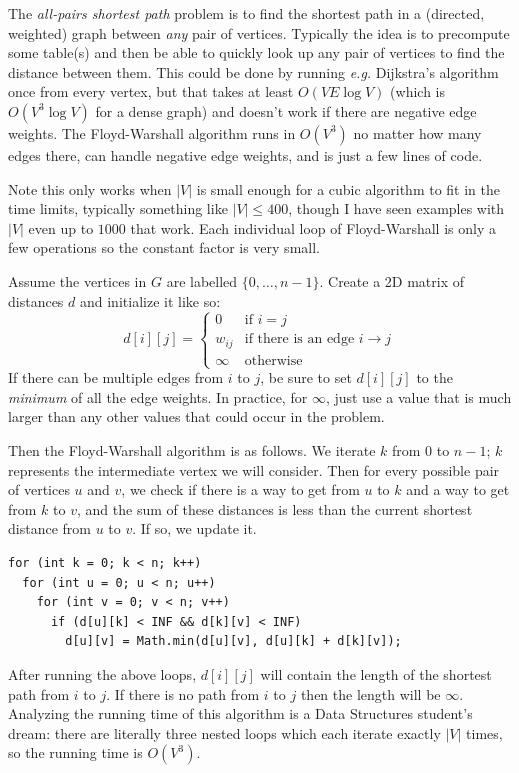 \documentclass[10pt]{book}
\begin{document}
The \emph{all-pairs shortest path} problem is to find the shortest
path in a (directed, weighted) graph between \emph{any} pair of
vertices.  Typically the idea is to precompute some table(s)
and then be able to quickly look up any pair of vertices to find the
distance between them.  This could be done by running \emph{e.g.}
Dijkstra's algorithm once from every vertex, but that takes at least
$O(VE \log V)$ (which is $O(V^3 \log V)$ for a dense graph) and
doesn't work if there are negative edge weights. The Floyd-Warshall
algorithm runs in $O(V^3)$ no matter how many edges there, can
handle negative edge weights, and is just a few lines of code.

Note this only works when $|V|$ is small enough for a cubic algorithm
to fit in the time limits, typically something like $|V| \leq 400$,
though I have seen examples with $|V|$ even up to $1000$ that work.
Each individual loop of Floyd-Warshall is only a few operations so the
constant factor is very small.

Assume the vertices in $G$ are labelled $\{0, \dots, n-1\}$.  Create a
2D matrix of distances $d$ and initialize it like so:
\[ d[i][j] =
  \begin{cases}
    0      & \text{if $i = j$} \\
    w_{ij} & \text{if there is an edge $i \to j$} \\
    \infty & \text{otherwise}
  \end{cases}
\]
If there can be multiple edges from $i$ to $j$, be sure to set
$d[i][j]$ to the \emph{minimum} of all the edge weights. In practice,
for $\infty$, just use a value that is much larger than any other
values that could occur in the problem.

Then the Floyd-Warshall algorithm is as follows.  We iterate $k$ from
$0$ to $n-1$; $k$ represents the intermediate vertex we will consider.
Then for every possible pair of vertices $u$ and $v$, we check if
there is a way to get from $u$ to $k$ and a way to get from $k$ to
$v$, and the sum of these distances is less than the current shortest
distance from $u$ to $v$.  If so, we update it.

\begin{verbatim}
for (int k = 0; k < n; k++)
  for (int u = 0; u < n; u++)
    for (int v = 0; v < n; v++)
      if (d[u][k] < INF && d[k][v] < INF)
        d[u][v] = Math.min(d[u][v], d[u][k] + d[k][v]);
\end{verbatim}

After running the above loops, $d[i][j]$ will contain the length of
the shortest path from $i$ to $j$.  If there is no path from $i$ to
$j$ then the length will be $\infty$.  Analyzing the running time of
this algorithm is a Data Structures student's dream: there are
literally three nested loops which each iterate exactly $|V|$ times, so the
running time is $O(V^3)$.
\end{document}
